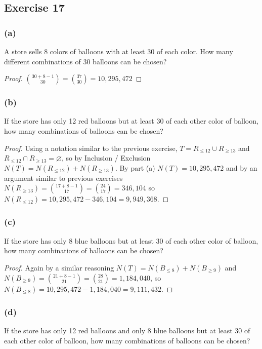 \documentclass[14pt]{extarticle}
\newcommand{\es}{\varnothing}
\begin{document}
\subsection{Exercise 17}
\subsubsection{(a)}
A store sells 8 colors of balloons with at least 30 of each color. How many different combinations of 30 balloons can be
chosen?

\begin{proof}
     \(\binom{30+8-1}{30} = \binom{37}{30} = 10,295,472\)
\end{proof}

\subsubsection{(b)}
If the store has only 12 red balloons but at least 30 of each other color of balloon, how many combinations of balloons can
be chosen?

\begin{proof}
     Using a notation similar to the previous exercise, \(T = R_{\leq 12} \cup R_{\geq 13}\) and \(R_{\leq 12} \cap
     R_{\geq 13} = \es\), so by Inclusion / Exclusion \(N(T) = N(R_{\leq 12}) + N(R_{\geq 13})\). By part (a) \(N(T) =
     10,295,472\) and by an argument similar to previous exercises \(N(R_{\geq 13}) = \binom{17+8-1}{17} = \binom{24}{17} =
     346,104\) so \(N(R_{\leq 12}) = 10,295,472 - 346,104 = 9,949,368\).
\end{proof}

\subsubsection{(c)}
If the store has only 8 blue balloons but at least 30 of each other color of balloon, how many combinations of balloons can
be chosen?

\begin{proof}
     Again by a similar reasoning \(N(T) = N(B_{\leq 8}) + N(B_{\geq 9})\) and \(N(B_{\geq 9}) = \binom{21 + 8 - 1}{21}
     = \binom{28}{21} = 1,184,040\), so \(N(B_{\leq 8}) = 10,295,472 - 1,184,040 = 9,111,432\).
\end{proof}

\subsubsection{(d)}
If the store has only 12 red balloons and only 8 blue balloons but at least 30 of each other color of balloon, how many
combinations of balloons can be chosen?
\end{document}
